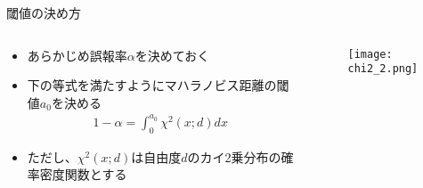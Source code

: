 \documentclass[aspectratio=169,unicode,dvipdfmx,14pt]{beamer}
\begin{document}
\begin{frame}{閾値の決め方}
\begin{columns}[onlytextwidth]
\begin{column}{.6\textwidth}
\begin{itemize}
\item あらかじめ誤報率$\alpha$を決めておく
\item 下の等式を満たすようにマハラノビス距離の閾値$a_0$を決める
\begin{align}
1 - \alpha = \int_0^{a_0} \chi^2(x;d) dx
\end{align}
\item ただし、$\chi^2(x;d)$は自由度$d$のカイ2乗分布の確率密度関数とする
\end{itemize}
\end{column}
\begin{column}{.4\textwidth}
\begin{figure}[htbp]
\begin{center}
\texttt{[image: chi2\_2.png]}
\end{center}
\end{figure}
\end{column}
\end{columns}
\end{frame}
\end{document}
